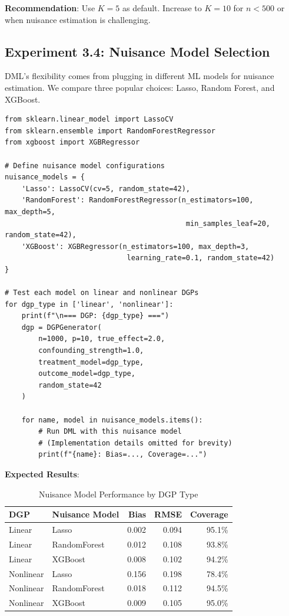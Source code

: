 %

\textbf{Recommendation}: Use $K=5$ as default. Increase to $K=10$ for $n < 500$ or when nuisance estimation is challenging.

\subsection{Experiment 3.4: Nuisance Model Selection}

DML's flexibility comes from plugging in different ML models for nuisance estimation. We compare three popular choices: Lasso, Random Forest, and XGBoost.

\begin{verbatim}
from sklearn.linear_model import LassoCV
from sklearn.ensemble import RandomForestRegressor
from xgboost import XGBRegressor

# Define nuisance model configurations
nuisance_models = {
    'Lasso': LassoCV(cv=5, random_state=42),
    'RandomForest': RandomForestRegressor(n_estimators=100, max_depth=5,
                                           min_samples_leaf=20, random_state=42),
    'XGBoost': XGBRegressor(n_estimators=100, max_depth=3,
                             learning_rate=0.1, random_state=42)
}

# Test each model on linear and nonlinear DGPs
for dgp_type in ['linear', 'nonlinear']:
    print(f"\n=== DGP: {dgp_type} ===")
    dgp = DGPGenerator(
        n=1000, p=10, true_effect=2.0,
        confounding_strength=1.0,
        treatment_model=dgp_type,
        outcome_model=dgp_type,
        random_state=42
    )

    for name, model in nuisance_models.items():
        # Run DML with this nuisance model
        # (Implementation details omitted for brevity)
        print(f"{name}: Bias=..., Coverage=...")
\end{verbatim}

\textbf{Expected Results}:

\begin{table}[htbp]
\centering
\caption{Nuisance Model Performance by DGP Type}
\label{tab:exp34_nuisance}
\begin{tabular}{llrrr}
\hline
\textbf{DGP} & \textbf{Nuisance Model} & \textbf{Bias} & \textbf{RMSE} & \textbf{Coverage} \\
\hline
Linear & Lasso & 0.002 & 0.094 & 95.1\% \\
Linear & RandomForest & 0.012 & 0.108 & 93.8\% \\
Linear & XGBoost & 0.008 & 0.102 & 94.2\% \\
\hline
Nonlinear & Lasso & 0.156 & 0.198 & 78.4\% \\
Nonlinear & RandomForest & 0.018 & 0.112 & 94.5\% \\
Nonlinear & XGBoost & 0.009 & 0.105 & 95.0\% \\
\hline
\end{tabular}
\end{table}

